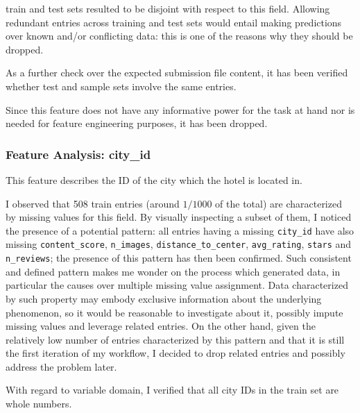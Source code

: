 \documentclass[preprint,12pt,3p]{elsarticle}
\begin{document}
train and test sets resulted to be disjoint with respect to this field. Allowing redundant entries across training and test sets would entail making predictions over known and/or conflicting data: this is one of the reasons why they should be dropped.

As a further check over the expected submission file content, it has been verified whether test and sample sets involve the same entries.

Since this feature does not have any informative power for the task at hand nor is needed for feature engineering purposes, it has been dropped.

\subsubsection{Feature Analysis: city\_id}
\label{city_id}
This feature describes the ID of the city which the hotel is located in.

I observed that 508 train entries (around $1/1000$ of the total) are characterized by missing values for this field. By visually inspecting a subset of them, I noticed the presence of a potential pattern: all entries having a missing \verb|city_id| have also missing \verb|content_score|, \verb|n_images|, \verb|distance_to_center|, \verb|avg_rating|, \verb|stars| and \verb|n_reviews|; the presence of this pattern has then been confirmed. Such consistent and defined pattern makes me wonder on the process which generated data, in particular the causes over multiple missing value assignment. Data characterized by such property may embody exclusive information about the underlying phenomenon, so it would be reasonable to investigate about it, possibly impute missing values and leverage related entries. On the other hand, given the relatively low number of entries characterized by this pattern and that it is still the first iteration of my workflow, I decided to drop related entries and possibly address the problem later.

With regard to variable domain, I verified that all city IDs in the train set are whole numbers.
\end{document}
